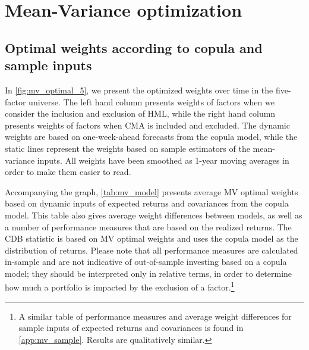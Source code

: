 
\section{Mean-Variance optimization} %
\label{sec:mean_variance}

\subsection{Optimal weights according to copula and sample inputs}

In \autoref{fig:mv_optimal_5}, we present the optimized weights over time in the five-factor universe. The left hand column presents weights of factors when we consider the inclusion and exclusion of HML, while the right hand column presents weights of factors when CMA is included and excluded. The dynamic weights are based on one-week-ahead forecasts from the copula model, while the static lines represent the weights based on sample estimators of the mean-variance inputs. All weights have been smoothed as 1-year moving averages in order to make them easier to read.

Accompanying the graph, \autoref{tab:mv_model} presents average MV optimal weights based on dynamic inputs of expected returns and covariances from the copula model. This table also gives average weight differences between models, as well as a number of performance measures that are based on the realized returns. The CDB statistic is based on MV optimal weights and uses the copula model as the distribution of returns. Please note that all performance measures are calculated in-sample and are not indicative of out-of-sample investing based on a copula model; they should be interpreted only in relative terms, in order to determine how much a portfolio is impacted by the exclusion of a factor.\footnote{A similar table of performance measures and average weight differences for sample inputs of expected returns and covariances is found in \autoref{app:mv_sample}. Results are qualitatively similar.}

